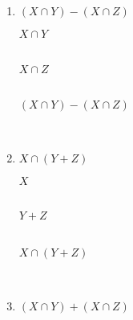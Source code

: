\documentclass[../notes.tex]{subfiles}
\begin{document}
\begin{enumerate}
\begin{enumerate}
\begin{center}
								\end{center}
							\pagebreak
							\item $(X \cap Y) - (X \cap Z)$
								\begin{center}
									$X \cap Y$\\
									\begin{venndiagram3sets}[shade=circle area, labelA=$X$, labelB=$Y$, labelC=$Z$]
										\fillACapB
									\end{venndiagram3sets}\\
									$X \cap Z$\\
									\begin{venndiagram3sets}[shade=circle area, labelA=$X$, labelB=$Y$, labelC=$Z$]
										\fillACapC
									\end{venndiagram3sets}\\
									$(X \cap Y) - (X \cap Z)$\\
									\begin{venndiagram3sets}[shade=circle area, labelA=$X$, labelB=$Y$, labelC=$Z$]
										\fillACapBNotC
									\end{venndiagram3sets}\\
								\end{center}
							\pagebreak
							\item $X \cap (Y + Z)$
								\begin{center}
									$X$\\
									\begin{venndiagram3sets}[shade=circle area, labelA=$X$, labelB=$Y$, labelC=$Z$]
										\fillA
									\end{venndiagram3sets}\\
									$Y + Z$\\
									\begin{venndiagram3sets}[shade=circle area, labelA=$X$, labelB=$Y$, labelC=$Z$]
										\fillBNotC
										\fillCNotB
									\end{venndiagram3sets}\\
									$X \cap (Y + Z)$\\
									\begin{venndiagram3sets}[shade=circle area, labelA=$X$, labelB=$Y$, labelC=$Z$]
										\fillACapBNotC
										\fillACapCNotB
									\end{venndiagram3sets}\\
								\end{center}
							\pagebreak
							\item $(X \cap Y) + (X \cap Z)$

\end{enumerate}
\end{enumerate}
\end{document}
